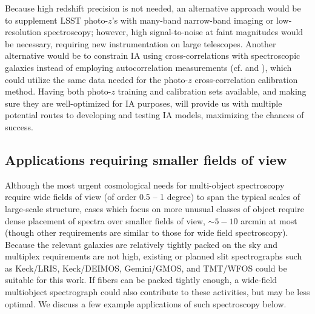 Because high redshift precision is not needed, an alternative approach would be to supplement LSST photo-$z$'s with many-band narrow-band imaging or low-resolution spectroscopy; however, high signal-to-noise at faint magnitudes would be necessary, requiring new instrumentation on large telescopes.
%
Another alternative would be to constrain IA using cross-correlations with spectroscopic galaxies instead of employing
autocorrelation measurements (cf. \citealt{Blazek} and \citealt{Chisari}), which could utilize the same data needed for the photo-$z$ cross-correlation calibration method.
Having both photo-$z$ training and calibration sets available, and making sure they are
well-optimized for IA purposes, will provide us with multiple potential routes to developing and
testing IA models, maximizing the chances of success.


\subsection{Applications requiring smaller fields of view}

Although the most urgent cosmological needs for multi-object spectroscopy require wide fields of view (of order 0.5 -- 1 degree) to span the typical scales of large-scale structure, cases which focus on more unusual classes of object require dense placement of spectra over smaller fields of view, $\sim 5-10$ arcmin at most (though other requirements are similar to those for wide field spectroscopy).  Because the relevant galaxies are relatively tightly packed on the sky and multiplex requirements are not high, existing or planned slit spectrographs such as Keck/LRIS, Keck/DEIMOS, Gemini/GMOS, and TMT/WFOS could be suitable for this work.  If fibers can be packed tightly enough, a wide-field multiobject spectrograph could also contribute to these activities, but may be less optimal.  We discuss a few example applications of such spectroscopy below. 

